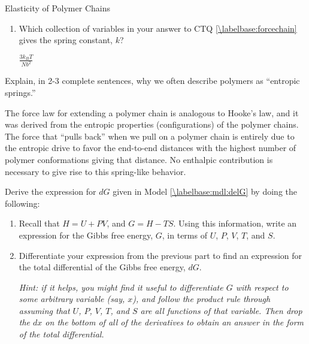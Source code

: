 \begin{activity}{Elasticity of Polymer Chains}
\begin{ctqs}
\begin{enumerate}
			\item Which collection of variables in your answer to CTQ \ref{\labelbase:forcechain} gives the spring constant, $k$?
		
				\begin{solution}[0.25in]
					$\frac{3k_BT}{Nb^2}$
				\end{solution}
			
		\end{enumerate}
		
	\question Explain, in 2-3 complete sentences, why we often describe polymers as ``entropic springs.''
	
		\begin{solution}[2.5in]
			The force law for extending a polymer chain is analogous to Hooke's law, and it was derived from the entropic properties (configurations) of the polymer chains.  The force that ``pulls back'' when we pull on a polymer chain is entirely due to the entropic drive to favor the end-to-end distances with the highest number of polymer conformations giving that distance.  No enthalpic contribution is necessary to give rise to this spring-like behavior.
		\end{solution}
	
\end{ctqs}
	
	
\begin{exercises}
	\exercise \label{\labelbase:exc:dG} Derive the expression for $dG$ given in Model \ref{\labelbase:mdl:delG} by doing the following:
	
		\begin{enumerate}
			\item Recall that $H = U+ PV$, and $G=H-TS$.  Using this information, write an expression for the Gibbs free energy, $G$, in terms of $U$, $P$, $V$, $T$, and $S$.
			
				\begin{solution}\end{solution}
			
			\item Differentiate your expression from the previous part to find an expression for the total differential of the Gibbs free energy, $dG$.
			
				\emph{Hint: if it helps, you might find it useful to differentiate $G$ with respect to some arbitrary variable (say, $x$), and follow the product rule through assuming that $U$, $P$, $V$, $T$, and $S$ are all functions of that variable.  Then drop the $dx$ on the bottom of all of the derivatives to obtain an answer in the form of the total differential.}
			

\end{enumerate}
\end{exercises}
\end{activity}
